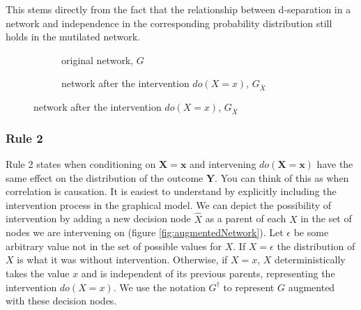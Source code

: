 \documentclass[11pt,a4paper]{article}
\begin{document}
This stems directly from the fact that the relationship between d-separation in a network and independence in the corresponding probability distribution still holds in the mutilated network. 

\begin{figure}[h]
\centering
\caption{Intervention in a causal bayesian network}
\label{fig:mutilatednet}
\begin{subfigure}[t]{0.3\textwidth}
\centering
\caption{original network, $G$}
\label{fig:mutilatedOriginal}
\end{subfigure}
\begin{subfigure}[t]{0.5\textwidth}
\centering
\caption{network after the intervention $do(X=x)$, $G_{\overline{X}}$}
\label{fig:mutilatedAfter}
\end{subfigure}
\end{figure}

\subsubsection{Rule 2}
Rule 2 states when conditioning on $\boldsymbol{X} = \boldsymbol{x}$ and intervening  $do(\boldsymbol{X}=\boldsymbol{x})$ have the same effect on the distribution of the outcome $\boldsymbol{Y}$. You can think of this as when correlation is causation. It is easiest to understand by explicitly including the intervention process in the graphical model. We can depict the possibility of intervention by adding a new decision node $\hat{X}$ as a parent of each $X$ in the set of nodes we are intervening on (figure \ref{fig:augmentedNetwork}). Let $\epsilon$ be some arbitrary value not in the set of possible values for $X$. If $X = \epsilon$ the distribution of $X$ is what it was without intervention. Otherwise, if $X=x$, $X$ deterministically takes the value $x$ and is independent of its previous parents, representing the intervention $do(X=x)$. We use the notation $G^{\dagger}$ to represent $G$ augmented with these decision nodes. 
\end{document}
